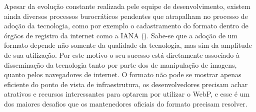 \documentclass[espaco=simples,appendix=Name]{abnt}
\begin{document}
Apesar da evolução constante realizada pele equipe de desenvolvimento, existem ainda diversos processos burocráticos pendentes que atrapalham no processo de adoção da tecnologia, como por exemplo o cadastramento do formato dentro de órgãos de registro da internet como a IANA (). Sabe-se que a adoção de um formato depende não somente da qualidade da tecnologia, mas sim da amplitude de sua utilização. Por este motivo o seu sucesso está diretamente associado à disseminação da tecnologia tanto por parte dos  de manipulação de imagens, quanto pelos navegadores de internet. O formato não pode se mostrar apenas eficiente do ponto de vista de infraestrutura, os desenvolvedores precisam achar atrativos e recursos interessantes para optarem por utilizar o WebP, e esse é um dos maiores desafios que os mantenedores oficiais do formato precisam resolver.


\end{document}

